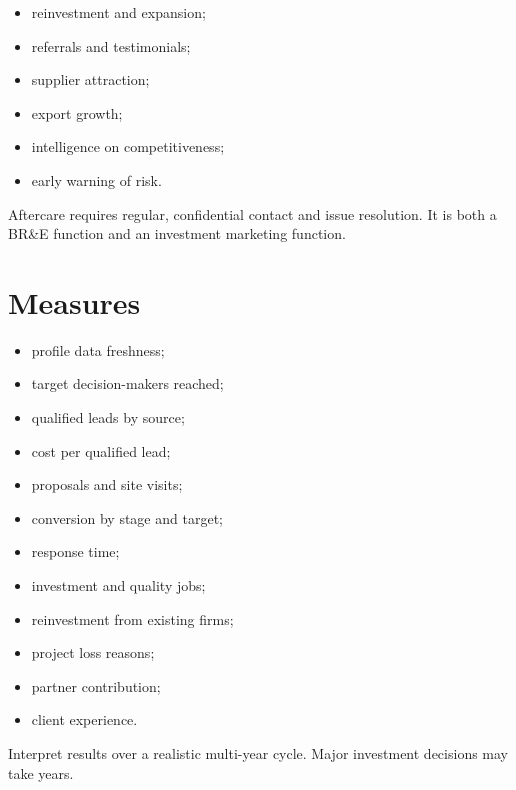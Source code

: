 \documentclass[11pt,letterpaper,oneside,openany]{book}
\begin{document}
\begin{itemize}
\item reinvestment and expansion;
\item referrals and testimonials;
\item supplier attraction;
\item export growth;
\item intelligence on competitiveness;
\item early warning of risk.
\end{itemize}


Aftercare requires regular, confidential contact and issue resolution. It is both a BR\&E function and an investment marketing function.


\section[Measures]{Measures}
\begin{itemize}
\item profile data freshness;
\item target decision-makers reached;
\item qualified leads by source;
\item cost per qualified lead;
\item proposals and site visits;
\item conversion by stage and target;
\item response time;
\item investment and quality jobs;
\item reinvestment from existing firms;
\item project loss reasons;
\item partner contribution;
\item client experience.
\end{itemize}


Interpret results over a realistic multi-year cycle. Major investment decisions may take years.
\end{document}

